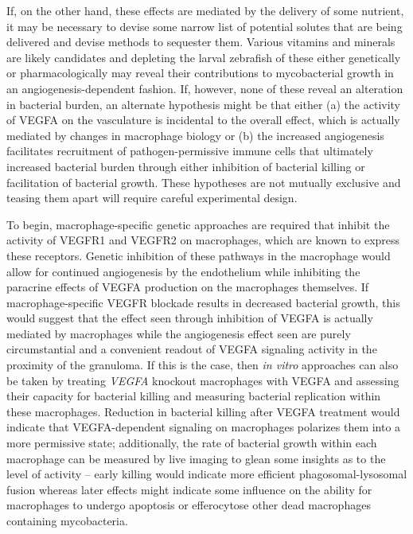 If, on the other hand, these effects are mediated by the delivery of some nutrient, it may be necessary to devise some narrow list of potential solutes that are being delivered and devise methods to sequester them. Various vitamins and minerals are likely candidates and depleting the larval zebrafish of these either genetically or pharmacologically may reveal their contributions to mycobacterial growth in an angiogenesis\hyp{}dependent fashion. If, however, none of these reveal an alteration in bacterial burden, an alternate hypothesis might be that either (a) the activity of VEGFA on the vasculature is incidental to the overall effect, which is actually mediated by changes in macrophage biology or (b) the increased angiogenesis facilitates recruitment of pathogen\hyp{}permissive immune cells that ultimately increased bacterial burden through either inhibition of bacterial killing or facilitation of bacterial growth. These hypotheses are not mutually exclusive and teasing them apart will require careful experimental design.

To begin, macrophage\hyp{}specific genetic approaches are required that inhibit the activity of VEGFR1 and VEGFR2 on macrophages, which are known to express these receptors. Genetic inhibition of these pathways in the macrophage would allow for continued angiogenesis by the endothelium while inhibiting the paracrine effects of VEGFA production on the macrophages themselves. If macrophage\hyp{}specific VEGFR blockade results in decreased bacterial growth, this would suggest that the effect seen through inhibition of VEGFA is actually mediated by macrophages while the angiogenesis effect seen are purely circumstantial and a convenient readout of VEGFA signaling activity in the proximity of the granuloma. If this is the case, then \textit{in vitro} approaches can also be taken by treating \textit{VEGFA} knockout macrophages with VEGFA and assessing their capacity for bacterial killing and measuring bacterial replication within these macrophages. Reduction in bacterial killing after VEGFA treatment would indicate that VEGFA\hyp{}dependent signaling on macrophages polarizes them into a more permissive state; additionally, the rate of bacterial growth within each macrophage can be measured by live imaging to glean some insights as to the level of activity -- early killing would indicate more efficient phagosomal\hyp{}lysosomal fusion whereas later effects might indicate some influence on the ability for macrophages to undergo apoptosis or efferocytose other dead macrophages containing mycobacteria.

